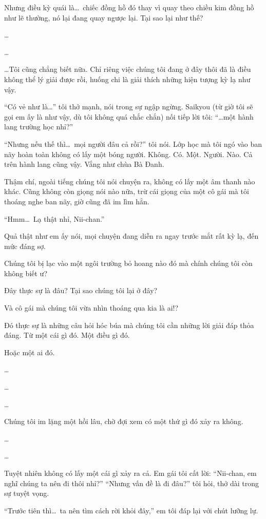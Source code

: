 \documentclass[../main.tex]{subfiles}
\begin{document}
Nhưng điều kỳ quái là\dots\ chiếc đồng hồ đó thay vì quay theo chiều kim đồng hồ như lẽ thường, nó lại đang quay ngược lại. Tại sao lại như thế?

\dots

\dots

\dots Tôi cũng chẳng biết nữa. Chỉ riêng việc chúng tôi đang ở đây thôi đã là điều không thể lý giải được rồi, huống chi là giải thích những hiện tượng kỳ lạ như vậy.

``Có vẻ như là\dots'' tôi thở mạnh, nói trong sự ngập ngừng. Saikyou (từ giờ tôi sẽ gọi em ấy là như vậy, dù tôi không quá chắc chắn) nối tiếp lời tôi: ``\dots một hành lang trường học nhỉ?''

``Nhưng nếu thế thì\dots\ mọi người đâu cả rồi?'' tôi nói. Lớp học mà tôi ngó vào ban nãy hoàn toàn không có lấy một bóng người. Không. Có. Một. Người. Nào. Cả trên hành lang cũng vậy. Vắng như chùa Bà Đanh.

Thậm chí, ngoài tiếng chúng tôi nói chuyện ra, không có lấy một âm thanh nào khác. Cũng không còn giọng nói nào nữa, trừ cái giọng của một cô gái mà tôi thoáng nghe ban nãy, giờ cũng đã im lìm hẳn.

``Hmm\dots\ Lạ thật nhỉ, Nii-chan.''

Quả thật như em ấy nói, mọi chuyện đang diễn ra ngay trước mắt rất kỳ lạ, đến mức đáng sợ.

Chúng tôi bị lạc vào một ngôi trường bỏ hoang nào đó mà chính chúng tôi còn không biết ư?

Đây thực sự là đâu? Tại sao chúng tôi lại ở đây?

Và cô gái mà chúng tôi vừa nhìn thoáng qua kia là ai!?

Đó thực sự là những câu hỏi hóc búa mà chúng tôi cần những lời giải đáp thỏa đáng. Từ một cái gì đó. Một điều gì đó.

Hoặc một ai đó.

\dots

\dots

\dots

Chúng tôi im lặng một hồi lâu, chờ đợi xem có một thứ gì đó xảy ra không.

\dots

\dots

Tuyệt nhiên không có lấy một cái gì xảy ra cả. Em gái tôi cất lời: ``Nii-chan, em nghĩ chúng ta nên đi thôi nhỉ?''
``Nhưng vấn đề là đi đâu?'' tôi hỏi, thở dài trong sự tuyệt vọng.

``Trước tiên thì\dots\ ta nên tìm cách rời khỏi đây,'' em tôi đáp lại với chút lưỡng lự.
\end{document}
